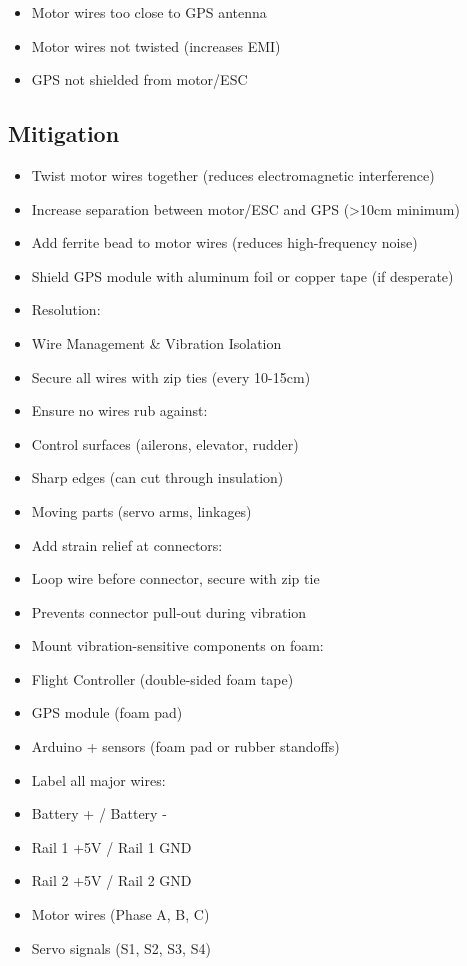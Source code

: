 \documentclass[11pt,letterpaper]{article}
\begin{document}
\begin{itemize}
  \item Motor wires too close to GPS antenna
  \item Motor wires not twisted (increases EMI)
  \item GPS not shielded from motor/ESC
\end{itemize}

\subsection{Mitigation}

\begin{itemize}
  \item Twist motor wires together (reduces electromagnetic interference)
  \item Increase separation between motor/ESC and GPS (>10cm minimum)
  \item Add ferrite bead to motor wires (reduces high-frequency noise)
  \item Shield GPS module with aluminum foil or copper tape (if desperate)
\end{itemize}

\begin{itemize}
  \item Resolution: \underline{\hspace{8.85cm}}
\end{itemize}

\begin{itemize}
  \item Wire Management \& Vibration Isolation
  \item Secure all wires with zip ties (every 10-15cm)
  \item Ensure no wires rub against:
  \item Control surfaces (ailerons, elevator, rudder)
  \item Sharp edges (can cut through insulation)
  \item Moving parts (servo arms, linkages)
  \item Add strain relief at connectors:
  \item Loop wire before connector, secure with zip tie
  \item Prevents connector pull-out during vibration
  \item Mount vibration-sensitive components on foam:
  \item Flight Controller (double-sided foam tape)
  \item GPS module (foam pad)
  \item Arduino + sensors (foam pad or rubber standoffs)
  \item Label all major wires:
  \item Battery + / Battery -
  \item Rail 1 +5V / Rail 1 GND
  \item Rail 2 +5V / Rail 2 GND
  \item Motor wires (Phase A, B, C)
  \item Servo signals (S1, S2, S3, S4)
\end{itemize}
\end{document}
